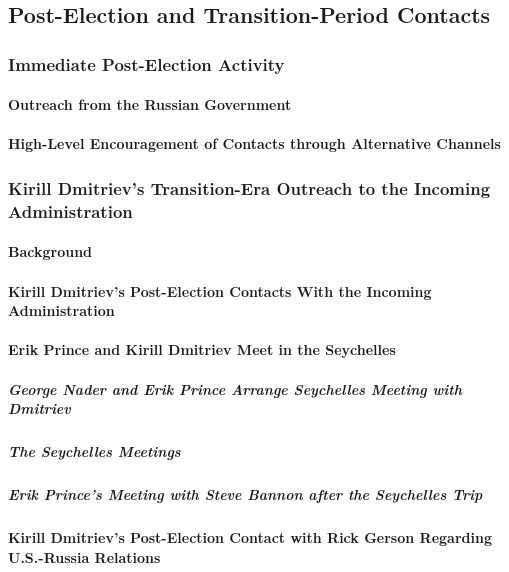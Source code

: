 \subsection{Post-Election and Transition-Period Contacts}

\subsubsection{Immediate Post-Election Activity}

\paragraph{Outreach from the Russian Government}

\paragraph{High-Level Encouragement of Contacts through Alternative Channels}

\subsubsection{Kirill Dmitriev's Transition-Era Outreach to the Incoming Administration}

\paragraph{Background}

\paragraph{Kirill Dmitriev's Post-Election Contacts With the Incoming Administration}

\paragraph{Erik Prince and Kirill Dmitriev Meet in the Seychelles}

\subparagraph{George Nader and Erik Prince Arrange Seychelles Meeting with Dmitriev}

\subparagraph{The Seychelles Meetings}

\subparagraph{Erik Prince's Meeting with Steve Bannon after the Seychelles Trip}

\paragraph{Kirill Dmitriev's Post-Election Contact with Rick Gerson Regarding U.S.-Russia Relations}


